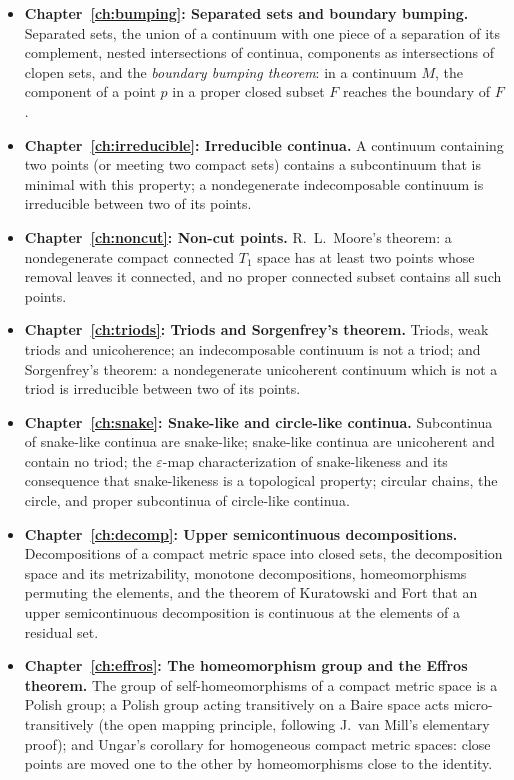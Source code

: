 \begin{itemize}
\item \textbf{Chapter~\ref{ch:bumping}: Separated sets and boundary bumping.} Separated sets, the
union of a continuum with one piece of a separation of its complement, nested intersections of
continua, components as intersections of clopen sets, and the \emph{boundary bumping theorem}:
in a continuum $M$, the component of a point $p$ in a proper closed subset $F$ reaches the
boundary of $F$.
\item \textbf{Chapter~\ref{ch:irreducible}: Irreducible continua.} A continuum containing two
points (or meeting two compact sets) contains a subcontinuum that is minimal with this
property; a nondegenerate indecomposable continuum is irreducible between two of its points.
\item \textbf{Chapter~\ref{ch:noncut}: Non-cut points.} R.~L.~Moore's theorem: a nondegenerate
compact connected $T_1$ space has at least two points whose removal leaves it connected, and no
proper connected subset contains all such points.
\item \textbf{Chapter~\ref{ch:triods}: Triods and Sorgenfrey's theorem.} Triods, weak triods and
unicoherence; an indecomposable continuum is not a triod; and Sorgenfrey's theorem: a
nondegenerate unicoherent continuum which is not a triod is irreducible between two of its
points.
\item \textbf{Chapter~\ref{ch:snake}: Snake-like and circle-like continua.} Subcontinua of
snake-like continua are snake-like; snake-like continua are unicoherent and contain no triod;
the $\varepsilon$-map characterization of snake-likeness and its consequence that snake-likeness
is a topological property; circular chains, the circle, and proper subcontinua of circle-like
continua.
\item \textbf{Chapter~\ref{ch:decomp}: Upper semicontinuous decompositions.} Decompositions of a
compact metric space into closed sets, the decomposition space and its metrizability, monotone
decompositions, homeomorphisms permuting the elements, and the theorem of Kuratowski and Fort
that an upper semicontinuous decomposition is continuous at the elements of a residual set.
\item \textbf{Chapter~\ref{ch:effros}: The homeomorphism group and the Effros theorem.} The group
of self-homeomorphisms of a compact metric space is a Polish group; a Polish group acting
transitively on a Baire space acts micro-transitively (the open mapping principle, following
J.~van Mill's elementary proof); and Ungar's corollary for homogeneous compact metric spaces:
close points are moved one to the other by homeomorphisms close to the identity.
\end{itemize}

